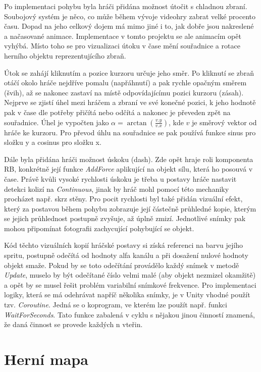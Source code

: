 \documentclass[FM,Proj]{tulthesis}
\begin{document}
	Po implementaci pohybu byla hráči přidána možnost útočit s chladnou zbraní. Soubojový systém je něco, co může během vývoje videohry zabrat velké procento času. Dopad na jeho celkový dojem má mimo jiné i to, jak dobře jsou nakreslené a načasované animace. Implementace v tomto projektu se ale animacím opět vyhýbá. Místo toho se pro vizualizaci útoku v čase mění souřadnice a rotace herního objektu reprezentujícího zbraň.
	
	Útok se zahájí kliknutím a pozice kurzoru určuje jeho směr. Po kliknutí se zbraň otáčí okolo hráče nejdříve pomalu (napřáhnutí) a pak rychle opačným směrem (švih), až se nakonec zastaví na místě odpovídajícímu pozici kurzoru (zásah). Nejprve se zjistí úhel mezi hráčem a zbraní ve své konečné pozici, k jeho hodnotě pak v čase dle potřeby přičítá nebo odčítá a nakonec je převeden zpět na souřadnice. Úhel je vypočten jako $\alpha = \arctan{(\frac{v.y}{v.x})}$, kde $v$ je směrový vektor od hráče ke kurzoru. Pro převod úhlu na souřadnice se pak používá funkce sinus pro složku y a cosinus pro složku x.
	
	Dále byla přidána hráči možnost úskoku (dash). Zde opět hraje roli komponenta RB, konkrétně její funkce \textit{AddForce} aplikující na objekt sílu, která ho posouvá v čase. Právě kvůli vysoké rychlosti úskoku je třeba u postavy hráče nastavit detekci kolizí na \textit{Continuous}, jinak by hráč mohl pomocí této mechaniky procházet např. skrz stěny. Pro pocit rychlosti byl také přidán vizuální efekt, který za postavou během pohybu zobrazuje její částečně průhledné kopie, kterým se jejich průhlednost postupně zvyšuje, až úplně zmizí. Jednotlivé snímky pak mohou připomínat fotografii zachycující pohybující se objekt.
	
	Kód těchto vizuálních kopií hráčské postavy si získá referenci na barvu jejího spritu, postupně odečítá od hodnoty alfa kanálu a při dosažení nulové hodnoty objekt smaže. Pokud by se toto odečítání provádělo každý snímek v metodě \textit{Update}, muselo by být odečítané číslo velmi malé (aby objekt nezmizel okamžitě) a opět by se musel řešit problém variabilní snímkové frekvence. Pro implementaci logiky, která se má odehrávat napříč několika snímky, je v Unity vhodné použít tzv. \textit{Coroutine}. Jedná se o koprogram, ve kterém lze použít např. funkci \textit{WaitForSeconds}. Tato funkce zabalená v cyklu s nějakou jinou činností znamená, že daná činnost se provede každých n vteřin. 
	
	\section{Herní mapa} %
	
\end{document}
